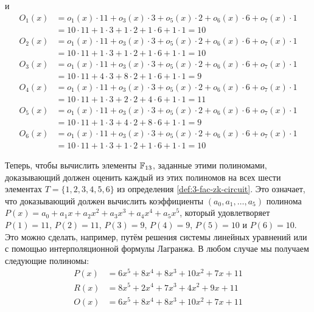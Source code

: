и
\begin{align*}
O_1(x) & = o_1(x)\cdot 11 + o_3(x)\cdot 3 + o_5(x)\cdot 2 + o_6(x)\cdot 6 + o_7(x)\cdot 1 \\
       & = 10\cdot 11 + 1\cdot 3 + 1\cdot 2 + 1\cdot 6 + 1\cdot 1 = 10\\
O_2(x) & = o_1(x)\cdot 11 + o_3(x)\cdot 3 + o_5(x)\cdot 2 + o_6(x)\cdot 6 + o_7(x)\cdot 1 \\
       & = 10\cdot 11 + 1\cdot 3 + 1\cdot 2 + 1\cdot 6 + 1\cdot 1 = 10\\
O_3(x) & = o_1(x)\cdot 11 + o_3(x)\cdot 3 + o_5(x)\cdot 2 + o_6(x)\cdot 6 + o_7(x)\cdot 1 \\
       & = 10\cdot 11 + 4\cdot 3 + 8\cdot 2 + 1\cdot 6 + 1\cdot 1 = 9\\
O_4(x) & = o_1(x)\cdot 11 + o_3(x)\cdot 3 + o_5(x)\cdot 2 + o_6(x)\cdot 6 + o_7(x)\cdot 1 \\
       & = 10\cdot 11 + 1\cdot 3 + 2\cdot 2 + 4\cdot 6 + 1\cdot 1 = 11\\
O_5(x) & = o_1(x)\cdot 11 + o_3(x)\cdot 3 + o_5(x)\cdot 2 + o_6(x)\cdot 6 + o_7(x)\cdot 1 \\
       & = 10\cdot 11 + 1\cdot 3 + 4\cdot 2 + 8\cdot 6 + 1\cdot 1 = 9\\
O_6(x) & = o_1(x)\cdot 11 + o_3(x)\cdot 3 + o_5(x)\cdot 2 + o_6(x)\cdot 6 + o_7(x)\cdot 1 \\
       & = 10\cdot 11 + 1\cdot 3 + 1\cdot 2 + 1\cdot 6 + 1\cdot 1 = 10
\end{align*}

Теперь, чтобы вычислить элементы $\mathbb{F}_{13}$, заданные этими полиномами, доказывающий должен оценить каждый из этих полиномов на всех шести элементах $T=\{1,2,3,4,5,6\}$ из определения \ref{def:3-fac-zk-circuit}. Это означает, что доказывающий должен вычислить коэффициенты $(a_0,a_1,\ldots,a_5)$ полинома $P(x)=a_0+a_1x+a_2x^2+a_3x^3+a_4x^4+a_5x^5$, который удовлетворяет $P(1)=11$, $P(2)=11$, $P(3)=9$, $P(4)=9$, $P(5)=10$ и $P(6)=10$. Это можно сделать, например, путём решения системы линейных уравнений или с помощью интерполяционной формулы Лагранжа. В любом случае мы получаем следующие полиномы:
\begin{align*}
P(x) & = 6x^5 + 8x^4 + 8x^3 + 10x^2 + 7x + 11\\
R(x) & = 8x^5 + 2x^4 + 7x^3 + 4x^2 + 9x + 11\\
O(x) & = 6x^5 + 8x^4 + 8x^3 + 10x^2 + 7x + 11
\end{align*}

